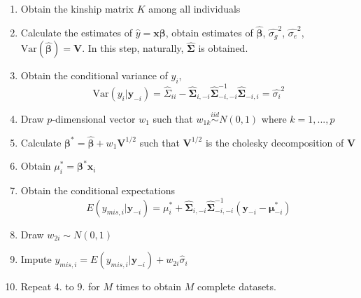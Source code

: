 \documentclass[preprint,12pt]{elsarticle}
\begin{document}
\begin{enumerate} 
    \item Obtain the kinship matrix $K$ among all individuals 
    \item Calculate the estimates of $\hat{y}=\mathbf{x}\boldsymbol{\beta}$, obtain estimates of $\hat{\boldsymbol{\beta}}$, $\hat{\sigma_g}^2$, $\hat{\sigma_e}^2$, $\text{Var}(\hat{\boldsymbol{\beta}})=\mathbf{V}$. In this step, naturally, $\boldsymbol{\hat{\Sigma}}$ is obtained.
    \item Obtain the conditional variance of $y_i$, 
    \begin{equation} 
        \text{Var}(y_i|\mathbf{y}_{-i})=\hat{\Sigma}_{ii}-\hat{\boldsymbol{\Sigma}}_{i,-i}\hat{\boldsymbol{\Sigma}}_{-i,-i}^{-1}\hat{\boldsymbol{\Sigma}}_{-i,i}=\hat{\sigma_i}^2
    \end{equation}
    \item Draw $p$-dimensional vector $w_1$ such that $w_{1k}\stackrel{iid}{\sim} N(0,1)$ where $k=1,...,p$
    \item Calculate $\boldsymbol{\beta}^*=\hat{\boldsymbol{\beta}}+w_1\mathbf{V}^{1/2}$ such that $\mathbf{V}^{1/2}$ is the cholesky decomposition of $\mathbf{V}$
    \item Obtain $\mu_i^*=\boldsymbol{\beta}^*\mathbf{x}_i$
    \item Obtain the conditional expectations 
    \begin{equation}
        E(y_{mis,i}|\mathbf{y}_{-i})=\mu_i^*+\hat{\boldsymbol{\Sigma}}_{i,-i}\hat{\boldsymbol{\Sigma}}_{-i,-i}^{-1}(\mathbf{y}_{-i}-\boldsymbol{\mu}^*_{-i})
    \end{equation}
    \item Draw $w_{2i}\sim N(0,1)$
    \item Impute $y_{mis,i}=E(y_{mis,i}|\mathbf{y}_{-i}) + w_{2i}\hat{\sigma}_i$
    \item Repeat 4. to 9. for $M$ times to obtain $M$ complete datasets.
\end{enumerate}




\newpage

\end{document}

